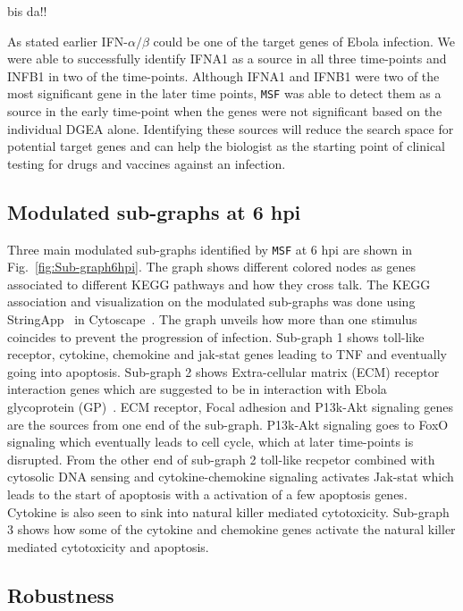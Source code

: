\documentclass[10pt,a4paper,twocolumn]{article}
\newcommand{\TODO}[1]{\begingroup\color{red}#1\endgroup}
\begin{document}
\TODO{bis da!!}

As stated earlier IFN-$\alpha / \beta$ could be one of the target
genes of Ebola infection. We were able to successfully identify IFNA1
as a source in all three time-points and INFB1 in two of the
time-points. Although IFNA1 and IFNB1 were two of the most significant
gene in the later time points, \texttt{MSF} was able to detect them as
a source in the early time-point when the genes were not significant
based on the individual DGEA alone. Identifying these sources will
reduce the search space for potential target genes and can help the
biologist as the starting point of clinical testing for drugs and
vaccines against an infection.



\subsection*{Modulated sub-graphs at 6 hpi}

 Three main modulated sub-graphs identified by \texttt{MSF} at 6 hpi
 are shown in Fig.~\ref{fig:Sub-graph6hpi}. The graph shows different colored nodes as
 genes associated to different KEGG pathways and how they cross talk. The KEGG
 association and visualization on the modulated sub-graphs was done
 using StringApp~\cite{StringApp} in Cytoscape~\cite{Cyto}. The graph
 unveils how more than one stimulus coincides to prevent the
 progression of infection. Sub-graph 1 shows toll-like receptor,
 cytokine, chemokine and jak-stat genes leading to TNF and eventually
 going into apoptosis. Sub-graph 2 shows Extra-cellular matrix (ECM)
 receptor interaction genes which are suggested to be in interaction
 with Ebola glycoprotein (GP)~\cite{Veljkovic}. ECM receptor, Focal
 adhesion and P13k-Akt signaling genes are the sources from one end of
 the sub-graph. P13k-Akt signaling goes to FoxO signaling which
 eventually leads to cell cycle, which at later time-points is
 disrupted. From the other end of sub-graph 2 toll-like recpetor
 combined with cytosolic DNA sensing and cytokine-chemokine signaling
 activates Jak-stat which leads to the start of apoptosis with a
 activation of a few apoptosis genes. Cytokine is also seen to sink
 into natural killer mediated cytotoxicity. Sub-graph 3 shows how some
 of the cytokine and chemokine genes activate the natural killer
 mediated cytotoxicity and apoptosis.
 
 \subsection*{Robustness}
 
\end{document}

